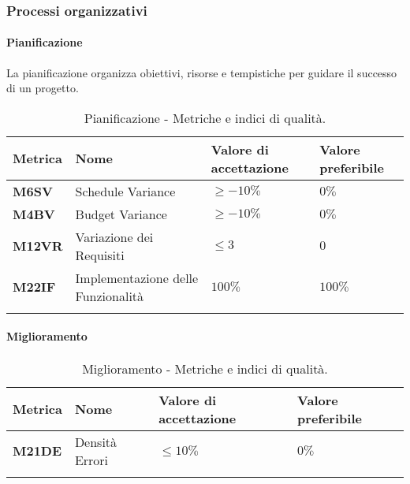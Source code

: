 \subsubsection{Processi organizzativi}

\paragraph{Pianificazione}
La pianificazione organizza obiettivi, risorse e tempistiche per guidare il successo di un progetto.

\hspace{1pt}
    \begin{longtable}{|C{1.5cm}|L{3cm}|L{2.5cm}|L{2.5cm}|}
        \hline
        \textbf{Metrica} & \textbf{Nome} & \textbf{Valore di accettazione} & \textbf{Valore preferibile} \\
        \hline
        \textbf{M6SV} & Schedule Variance & $\geq -10\%$ & $0\%$ \\
        \hline
        \textbf{M4BV} & Budget Variance & $\geq -10\%$ & $0\%$ \\
        \hline
        \textbf{M12VR} & Variazione dei Requisiti & $\leq 3$ & $0$ \\
        \hline
        \textbf{M22IF} & Implementazione delle Funzionalità & $ 100\%$ & $ 100\%$ \\
        \hline
    \caption{Pianificazione - Metriche e indici di qualità.}
    \label{tab:metriche_pianificazione}
\end{longtable}

\paragraph{Miglioramento}
\hspace{1pt}
    \begin{longtable}{|C{1.5cm}|L{3cm}|L{2.5cm}|L{2.5cm}|}
        \hline
        \textbf{Metrica} & \textbf{Nome} & \textbf{Valore di accettazione} & \textbf{Valore preferibile} \\
        \hline
        \textbf{M21DE} & Densità Errori & $\leq 10\%$ & $ 0\%$ \\
        \hline
    \caption{Miglioramento - Metriche e indici di qualità.}
    \label{tab:metriche_miglioramento}
\end{longtable}